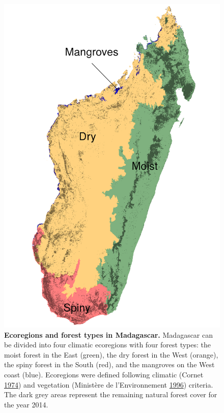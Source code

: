 \documentclass[]{article}
\theoremstyle{definition}
\theoremstyle{definition}
\theoremstyle{definition}
\theoremstyle{remark}
\begin{document}
\begin{figure}
\centering
\includegraphics{figs/ecoregion.png}
\caption{\textbf{Ecoregions and forest types in Madagascar.} Madagascar
can be divided into four climatic ecoregions with four forest types: the
moist forest in the East (green), the dry forest in the West (orange),
the spiny forest in the South (red), and the mangroves on the West coast
(blue). Ecoregions were defined following climatic (Cornet
\protect\hyperlink{ref-Cornet1974}{1974}) and vegetation (Ministère de
l'Environnement \protect\hyperlink{ref-IEFN1996}{1996}) criteria. The
dark grey areas represent the remaining natural forest cover for the
year 2014.}
\end{figure}
\end{document}
